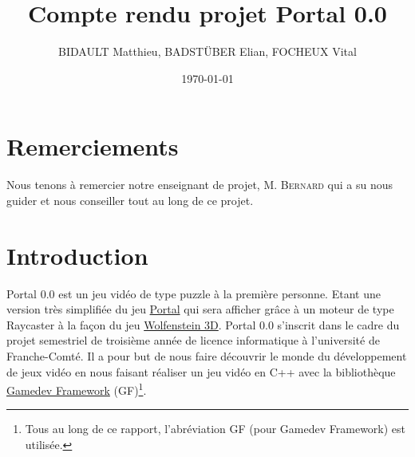 \documentclass[11pt]{article}
\title{Compte rendu projet Portal 0.0}
\author{BIDAULT Matthieu, BADSTÜBER Elian, FOCHEUX Vital}
\date{\today}
\begin{document}
\maketitle

\newpage

\section*{Remerciements}

Nous tenons à remercier notre enseignant de projet, M. \textsc{Bernard} 
qui a su nous guider et nous conseiller tout au long de ce projet.

\newpage

\tableofcontents

\newpage

\section{Introduction}

Portal 0.0 est un jeu vidéo de type puzzle à la première personne.
Etant une version très simplifiée du jeu \href{https://fr.wikipedia.org/wiki/Portal_(jeu_vid%C3%A9o)}{Portal}\cite{Portal}
qui sera afficher grâce à un moteur de type Raycaster à la façon du jeu
\href{https://fr.wikipedia.org/wiki/Wolfenstein_3D}{Wolfenstein 3D}\cite{Wolfenstein3D}.
Portal 0.0 s'inscrit dans le cadre du projet semestriel de troisième année de licence
informatique à l'université de Franche-Comté. Il a pour but de nous faire 
découvrir le monde du développement de jeux vidéo en nous faisant réaliser un jeu 
vidéo en C++ avec la bibliothèque \href{https://gamedevframework.github.io/}{Gamedev Framework} (GF\cite{GF})\footnote{Tous au long de ce rapport, l’abréviation GF (pour Gamedev Framework) est utilisée.}.

\end{document}
